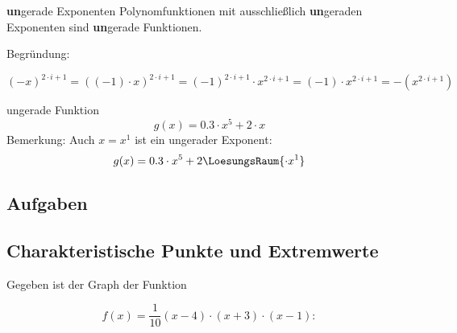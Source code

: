\begin{gesetz}{\textbf{un}gerade Exponenten}{}
  Polynomfunktionen mit ausschließlich \textbf{un}geraden Exponenten sind \textbf{un}gerade Funktionen.

  Begründung:

  $$(-x)^{2\cdot{}i + 1} = ((-1)\cdot{}x)^{2\cdot{}i+1} = (-1)^{2\cdot{}i+1} \cdot{} x^{2\cdot{}i+1} = (-1)\cdot{}x^{2\cdot{}i+1} = -\left(x^{2\cdot{}i+1}\right)$$

\end{gesetz}

\begin{beispiel}{ungerade Funktion}{}
  $$g(x) = 0.3\cdot{}x^5 + 2\cdot{}x $$
  Bemerkung: Auch $x=x^1$ ist ein ungerader Exponent:
  $$g(x) = 0.3\cdot{}x^5 + 2\LoesungsRaum{\cdot{}x^1} $$  
\end{beispiel}
\newpage


\subsection*{Aufgaben}

 





\newpage



\subsection{Charakteristische Punkte und Extremwerte}

Gegeben ist der Graph der Funktion

$$f(x)=\frac1{10}(x-4)\cdot{}(x+3)\cdot{}(x-1):$$

